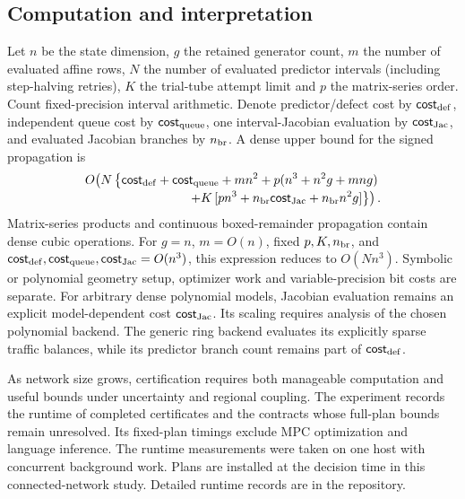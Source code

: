 \documentclass[preprint,12pt]{elsarticle}
\begin{document}
\subsection{Computation and interpretation}

Let $n$ be the state dimension, $g$ the retained generator count, $m$ the number
of evaluated affine rows, $N$ the number of evaluated predictor intervals
(including step-halving retries), $K$ the trial-tube
attempt limit and $p$ the matrix-series order. Count fixed-precision interval
arithmetic. Denote predictor/defect cost by $\mathsf{cost}_{\rm def}$, independent queue cost by
$\mathsf{cost}_{\rm queue}$, one interval-Jacobian evaluation by $\mathsf{cost}_{\rm Jac}$, and evaluated Jacobian
branches by $n_{\rm br}$. A dense upper bound for the signed propagation is
\begin{equation}
 \begin{split}
 O\!\left(N\left\{\mathsf{cost}_{\rm def}+\mathsf{cost}_{\rm queue}+mn^2
  +p(n^3+n^2g+mng)\right.\right.\\[-2pt]
 \left.\left.\hspace{12mm}+K\,[pn^3+n_{\rm br}\mathsf{cost}_{\rm Jac}+n_{\rm br}n^2g]\right\}\right).
 \end{split}
 \label{eq:network-computation}
\end{equation}
Matrix-series products and continuous boxed-remainder propagation contain
dense cubic operations. For $g=n$, $m=O(n)$, fixed $p,K,n_{\rm br}$, and
$\mathsf{cost}_{\rm def},\mathsf{cost}_{\rm queue},\mathsf{cost}_{\rm Jac}=O(n^3)$, this expression reduces to $O(Nn^3)$.
Symbolic or polynomial geometry setup, optimizer work and variable-precision
bit costs are separate. For arbitrary dense polynomial models, Jacobian
evaluation remains an explicit model-dependent cost $\mathsf{cost}_{\rm Jac}$. Its scaling
requires analysis of the chosen polynomial backend. The generic ring backend evaluates its explicitly sparse traffic
balances, while its predictor branch count remains part of $\mathsf{cost}_{\rm def}$.

As network size grows, certification requires both manageable computation
and useful bounds under uncertainty and regional coupling. The experiment
records the runtime of completed certificates and the
contracts whose full-plan bounds remain unresolved.
Its fixed-plan timings exclude MPC optimization and language inference.
The runtime measurements were taken on one host with concurrent
background work. Plans are installed at the decision time in this
connected-network study. Detailed runtime records are in the repository.
\end{document}
